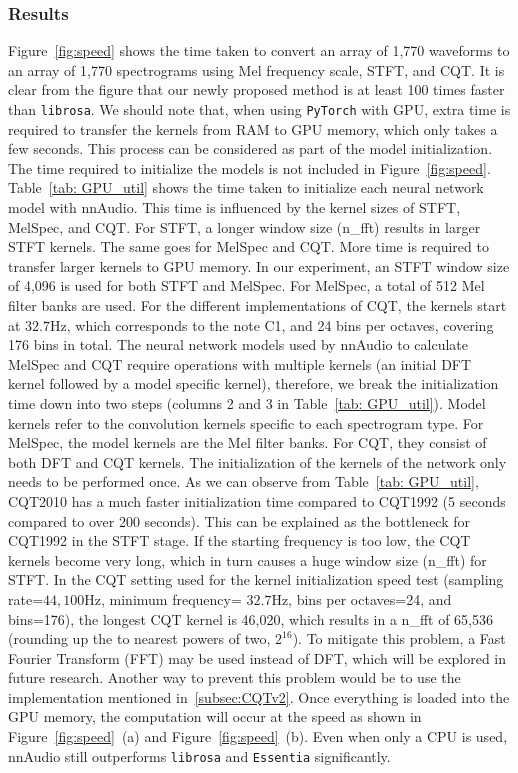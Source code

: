 \documentclass{ieeeaccess}
\newcommand{\nbh}[1]{\texttt{#1}}
\begin{document}
\subsubsection{Results}
Figure~\ref{fig:speed} shows the time taken to convert an array of 1,770 waveforms to an array of 1,770 spectrograms using Mel frequency scale, STFT, and CQT. It is clear from the figure that our newly proposed method is at least 100 times faster than \nbh{librosa}. We should note that, when using \nbh{PyTorch} with GPU, extra time is required to transfer the kernels from RAM to GPU memory, which only takes a few seconds. This process can be considered as part of the model initialization. The time required to initialize the models is not included in Figure~\ref{fig:speed}. Table~\ref{tab: GPU_util} shows the time taken to initialize each neural network model with nnAudio. This time is influenced by the kernel sizes of STFT, MelSpec, and CQT. For STFT, a longer window size (n\_fft) results in larger STFT kernels. The same goes for MelSpec and CQT. More time is required to transfer larger kernels to GPU memory. In our experiment, an STFT window size of 4,096 is used for both STFT and MelSpec. For MelSpec, a total of 512 Mel filter banks are used. For the different implementations of CQT, the kernels start at $32.7$Hz, which corresponds to the note C1, and 24 bins per octaves, covering 176 bins in total. The neural network models used by nnAudio to calculate MelSpec and CQT require operations with multiple kernels (an initial DFT kernel followed by a model specific kernel), therefore, we break the initialization time down into two steps (columns 2 and 3 in Table~\ref{tab: GPU_util}). Model kernels refer to the convolution kernels specific to each spectrogram type. For MelSpec, the model kernels are the Mel filter banks. For CQT, they consist of both DFT and CQT kernels. The initialization of the kernels of the network only needs to be performed once. As we can observe from Table~\ref{tab: GPU_util}, CQT2010 has a much faster initialization time compared to CQT1992 (5 seconds compared to over 200 seconds). This can be explained as the bottleneck for CQT1992 in the STFT stage. If the starting frequency is too low, the CQT kernels become very long, which in turn causes a huge window size (n\_fft) for STFT. In the CQT setting used for the kernel initialization speed test (sampling rate=$44,100$Hz, minimum frequency= $32.7$Hz, bins per octaves=24, and bins=176), the longest CQT kernel is 46,020, which results in a n\_fft of 65,536 (rounding up the to nearest powers of two, $2^{16}$). To mitigate this problem, a Fast Fourier Transform (FFT) may be used instead of DFT, which will be explored in future research. Another way to prevent this problem would be to use the implementation mentioned in~\ref{subsec:CQTv2}. Once everything is loaded into the GPU memory, the computation will occur at the speed as shown in Figure~\ref{fig:speed}~(a) and Figure~\ref{fig:speed}~(b). Even when only a CPU is used, nnAudio still outperforms \nbh{librosa} and \nbh{Essentia} significantly. 
\end{document}
